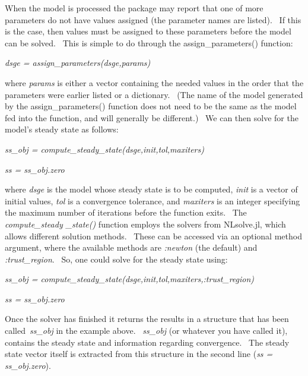 \documentclass[notitlepage,11pt]{article}
\begin{document}
\bigskip

When the model is processed the package may report that one of more
parameters do not have values assigned (the parameter names are listed). \
If this is the case, then values must be assigned to these parameters before
the model can be solved. \ This is simple to do through the
assign\_parameters() function:

\bigskip

\textit{dsge = assign\_parameters(dsge,params)}

\bigskip

where \textit{params} is either a vector containing the needed values in the
order that the parameters were earlier listed or a dictionary. \ (The name
of the model generated by the assign\_parameters() function does not need to
be the same as the model fed into the function, and will generally be
different.) \ We can then solve for the model's steady state as follows:

\bigskip

\textit{ss\_obj = compute\_steady\_state(dsge,init,tol,maxiters)}

\textit{ss = ss\_obj.zero}

\bigskip

where \textit{dsge} is the model whose steady state is to be computed, 
\textit{init} is a vector of initial values, \textit{tol} is a convergence
tolerance, and \textit{maxiters} is an integer specifying the maximum number
of iterations before the function exits. \ The \textit{compute\_steady%
\_state()} function employs the solvers from NLsolve.jl, which allows
different solution methods. \ These can be accessed via an optional method
argument, where the available methods are \textit{:newton} (the default) and 
\textit{:trust\_region}. \ So, one could solve for the steady state using:

\bigskip 

\textit{ss\_obj =
compute\_steady\_state(dsge,init,tol,maxiters,:trust\_region)}

\textit{ss = ss\_obj.zero}

\bigskip

Once the solver has finished it returns the results in a structure that has
been called\ \textit{ss\_obj} in the example above. \ \textit{ss\_obj} (or
whatever you have called it), contains the steady state and information
regarding convergence. \ The steady state vector itself is extracted from
this structure in the second line (\textit{ss = ss\_obj.zero}).
\end{document}
